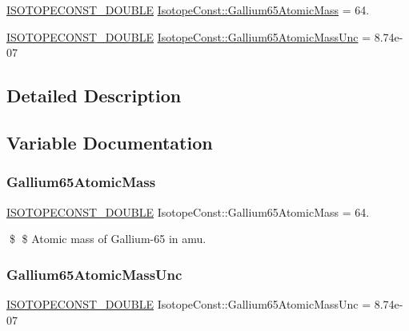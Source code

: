 \begin{DoxyCompactItemize}
\item 
\mbox{\hyperlink{group___isotope_const-_macros_ga8f45a7272ce02c0b4c65c44636ed719a}{I\+S\+O\+T\+O\+P\+E\+C\+O\+N\+S\+T\+\_\+\+D\+O\+U\+B\+LE}} \mbox{\hyperlink{group___isotope_const-_gallium-_ga65_gadef778a723aeb3dfebe7d3e4bb077274}{Isotope\+Const\+::\+Gallium65\+Atomic\+Mass}} = 64.
\item 
\mbox{\hyperlink{group___isotope_const-_macros_ga8f45a7272ce02c0b4c65c44636ed719a}{I\+S\+O\+T\+O\+P\+E\+C\+O\+N\+S\+T\+\_\+\+D\+O\+U\+B\+LE}} \mbox{\hyperlink{group___isotope_const-_gallium-_ga65_ga55a66e92e254159a179764d4ab21e7d8}{Isotope\+Const\+::\+Gallium65\+Atomic\+Mass\+Unc}} = 8.\+74e-\/07
\end{DoxyCompactItemize}


\subsection{Detailed Description}


\subsection{Variable Documentation}
\mbox{\label{group___isotope_const-_gallium-_ga65_gadef778a723aeb3dfebe7d3e4bb077274}} 
\subsubsection{\texorpdfstring{Gallium65\+Atomic\+Mass}{Gallium65AtomicMass}}
{\footnotesize\ttfamily \mbox{\hyperlink{group___isotope_const-_macros_ga8f45a7272ce02c0b4c65c44636ed719a}{I\+S\+O\+T\+O\+P\+E\+C\+O\+N\+S\+T\+\_\+\+D\+O\+U\+B\+LE}} Isotope\+Const\+::\+Gallium65\+Atomic\+Mass = 64.}

\$ \$ Atomic mass of Gallium-\/65 in amu. \mbox{\label{group___isotope_const-_gallium-_ga65_ga55a66e92e254159a179764d4ab21e7d8}} 
\subsubsection{\texorpdfstring{Gallium65\+Atomic\+Mass\+Unc}{Gallium65AtomicMassUnc}}
{\footnotesize\ttfamily \mbox{\hyperlink{group___isotope_const-_macros_ga8f45a7272ce02c0b4c65c44636ed719a}{I\+S\+O\+T\+O\+P\+E\+C\+O\+N\+S\+T\+\_\+\+D\+O\+U\+B\+LE}} Isotope\+Const\+::\+Gallium65\+Atomic\+Mass\+Unc = 8.\+74e-\/07}

